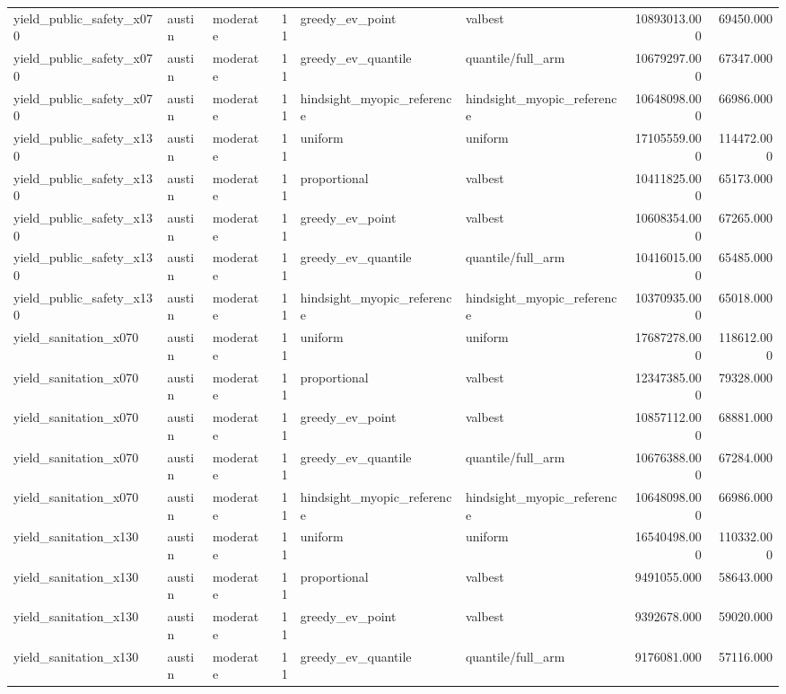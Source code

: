 \begin{tabular}{lllrllrr}
yield\_public\_safety\_x070 & austin & moderate & 11 & greedy\_ev\_point & valbest & 10893013.000 & 69450.000 \\
yield\_public\_safety\_x070 & austin & moderate & 11 & greedy\_ev\_quantile & quantile/full\_arm & 10679297.000 & 67347.000 \\
yield\_public\_safety\_x070 & austin & moderate & 11 & hindsight\_myopic\_reference & hindsight\_myopic\_reference & 10648098.000 & 66986.000 \\
yield\_public\_safety\_x130 & austin & moderate & 11 & uniform & uniform & 17105559.000 & 114472.000 \\
yield\_public\_safety\_x130 & austin & moderate & 11 & proportional & valbest & 10411825.000 & 65173.000 \\
yield\_public\_safety\_x130 & austin & moderate & 11 & greedy\_ev\_point & valbest & 10608354.000 & 67265.000 \\
yield\_public\_safety\_x130 & austin & moderate & 11 & greedy\_ev\_quantile & quantile/full\_arm & 10416015.000 & 65485.000 \\
yield\_public\_safety\_x130 & austin & moderate & 11 & hindsight\_myopic\_reference & hindsight\_myopic\_reference & 10370935.000 & 65018.000 \\
yield\_sanitation\_x070 & austin & moderate & 11 & uniform & uniform & 17687278.000 & 118612.000 \\
yield\_sanitation\_x070 & austin & moderate & 11 & proportional & valbest & 12347385.000 & 79328.000 \\
yield\_sanitation\_x070 & austin & moderate & 11 & greedy\_ev\_point & valbest & 10857112.000 & 68881.000 \\
yield\_sanitation\_x070 & austin & moderate & 11 & greedy\_ev\_quantile & quantile/full\_arm & 10676388.000 & 67284.000 \\
yield\_sanitation\_x070 & austin & moderate & 11 & hindsight\_myopic\_reference & hindsight\_myopic\_reference & 10648098.000 & 66986.000 \\
yield\_sanitation\_x130 & austin & moderate & 11 & uniform & uniform & 16540498.000 & 110332.000 \\
yield\_sanitation\_x130 & austin & moderate & 11 & proportional & valbest & 9491055.000 & 58643.000 \\
yield\_sanitation\_x130 & austin & moderate & 11 & greedy\_ev\_point & valbest & 9392678.000 & 59020.000 \\
yield\_sanitation\_x130 & austin & moderate & 11 & greedy\_ev\_quantile & quantile/full\_arm & 9176081.000 & 57116.000 \\

\end{tabular}
